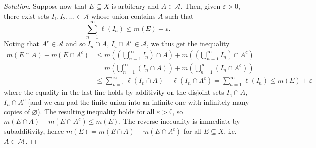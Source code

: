 \documentclass[10pt]{article}
\providecommand{\eps}{\varepsilon}
\newenvironment{soln}{\begin{proof}[Solution]}{\end{proof}}
\begin{document}
\begin{soln}
    Suppose now that $E\subseteq X$ is arbitrary and $A\in\mathcal A$.
    Then, given $\eps>0$, there exist sets $I_1,I_2,\dots\in\mathcal A$
    whose union contains $A$ such that
    \begin{equation*}
	\sum_{n=1}^\infty \ell(I_n) \le m(E) + \eps.
    \end{equation*}
    Noting that $A^c\in\mathcal A$
    and so $I_n\cap A$, $I_n\cap A^c\in\mathcal A$,
    we thus get the inequality
    \begin{align*}
	m(E\cap A) + m(E\cap A^c)
	&\le m\left(\left(\bigcup_{n=1}^\infty I_n\right) \cap A\right)
	+ m\left(\left(\bigcup_{n=1}^\infty I_n\right)\cap A^c\right)\\
	&= m\left(\bigcup_{n=1}^\infty (I_n\cap A)\right)
	+ m\left(\bigcup_{n=1}^\infty (I_n\cap A^c)\right)\\
	&\le \sum_{n=1}^\infty \ell(I_n\cap A) + \ell(I_n\cap A^c) =
	\sum_{n=1}^\infty \ell(I_n) \le m(E) + \eps
    \end{align*}
    where the equality in the last line holds
    by additivity on the disjoint sets
    $I_n\cap A$, $I_n\cap A^c$
    (and we can pad the finite union into an infinite one
    with infinitely many copies of $\varnothing$).
    The resulting inequality holds
    for all $\eps>0$, so $m(E\cap A) + m(E\cap A^c) \le m(E)$.
    The reverse inequality is immediate by subadditivity,
    hence $m(E) = m(E\cap A) + m(E\cap A^c)$ for all $E\subseteq X$,
    i.e. $A\in\mathcal M$.
\end{soln}

\pagebreak
\end{document}
